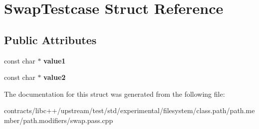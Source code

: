 \hypertarget{struct_swap_testcase}{}\section{Swap\+Testcase Struct Reference}
\label{struct_swap_testcase}
\subsection*{Public Attributes}
\begin{DoxyCompactItemize}
\item 
\mbox{\label{struct_swap_testcase_aa0d6265368b690f2a88be154092af10e}} 
const char $\ast$ {\bfseries value1}
\item 
\mbox{\label{struct_swap_testcase_aee219d6f3f884cc3c196060c5e21796a}} 
const char $\ast$ {\bfseries value2}
\end{DoxyCompactItemize}


The documentation for this struct was generated from the following file\+:\begin{DoxyCompactItemize}
\item 
contracts/libc++/upstream/test/std/experimental/filesystem/class.\+path/path.\+member/path.\+modifiers/swap.\+pass.\+cpp\end{DoxyCompactItemize}
